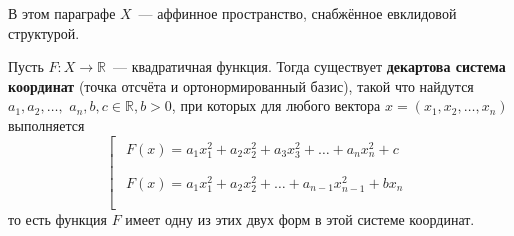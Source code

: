 \documentclass[11pt]{report}
\begin{document}
    В этом параграфе $X$~--- аффинное пространство, снабжённое евклидовой структурой.

    \begin{theorem}
    Пусть $F: X \to \mathbb{R}$~--- квадратичная функция. Тогда существует \textbf{декартова система координат} (точка отсчёта и ортонормированный базис), такой что найдутся $a_1, a_2, \hdots,$  $a_n, b, c \in \mathbb{R}, b > 0$, при которых для любого вектора $x = (x_1, x_2, \hdots, x_n)$ выполняется
    \begin{equation*}
        \left[
      \begin{gathered}
          \begin{gathered}
            F(x) = a_1x_1^2 + a_2x_2^2 + a_3x_3^2 + \hdots + a_nx_n^2 + c
            \\
          \end{gathered}
        \\
          \begin{gathered}
            F(x) = a_1x_1^2 + a_2x_2^2 + \hdots + a_{n-1}x_{n-1}^2 + bx_n
            \\
          \end{gathered}
        \\
      \end{gathered}
    \right.
    \end{equation*}
    то есть функция $F$ имеет одну из этих двух форм в этой системе координат.\end{theorem}
\end{document}
